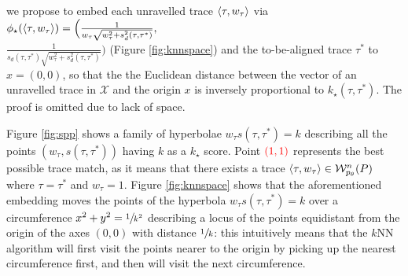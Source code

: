  we propose 
 to embed each unravelled trace $\braket{\tau,w_\tau}$ via $\phi_\star(\braket{\tau,w_\tau})=\Big(\frac{1}{w_\tau\sqrt{w_\tau^2+s_d^2(\tau,\tau^*)}},$\\  $\frac{1}{s_d(\tau,\tau^*)\sqrt{w_\tau^2+s_d^2(\tau,\tau^*)}}\Big)$ (Figure \ref{fig:knnspace}) and the to-be-aligned trace $\tau^*$ to $x=(0,0)$, so that the the Euclidean distance between the vector of an unravelled trace in $\mathcal{X}$ and the origin $x$ is  inversely proportional to $k_\star(\tau,\tau^*)$. The proof is omitted due to lack of space. 
 
\begin{example}
	Figure \ref{fig:spp} shows a family of hyperbolae $w_\tau s(\tau,\tau^*)=k$ describing all the points $(w_\tau, s(\tau,\tau^*))$ having $k$ as a $k_\star$ score. Point $\color{red}(1,1)$ represents the best possible trace match, as it means that there exists a trace $\braket{\tau,w_\tau}\in\mathcal{W}_{p_\theta}^n(P)$ where $\tau=\tau^*$ and $w_\tau=1$.
		Figure \ref{fig:knnspace} shows that the aforementioned embedding moves the points of the hyperbola $w_\tau s(\tau,\tau^*)=k$ over a circumference $x^2+y^2=\sfrac{1}{k^2}$ describing a locus of the points equidistant from the origin of the axes $(0,0)$ with distance $\sfrac{1}{k}$: this intuitively means that the $k$NN algorithm will first visit the points nearer to the origin by picking up the nearest circumference first, and then will visit the next circumference.
\end{example}

